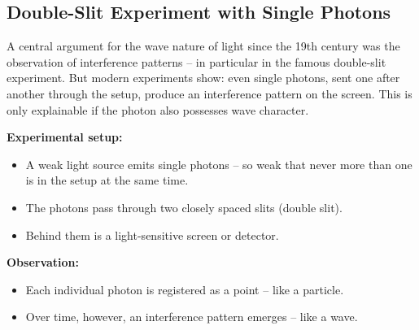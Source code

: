 \subsection{Double-Slit Experiment with Single Photons}

A central argument for the wave nature of light since the 19th century was the observation of interference patterns – in particular in the famous double-slit experiment. But modern experiments show: even single photons, sent one after another through the setup, produce an interference pattern on the screen. This is only explainable if the photon also possesses wave character.


\textbf{Experimental setup:}
\begin{itemize}
	\item A weak light source emits single photons – so weak that never more than one is in the setup at the same time.
	\item The photons pass through two closely spaced slits (double slit).
	\item Behind them is a light-sensitive screen or detector.
\end{itemize}

\textbf{Observation:}
\begin{itemize}
	\item Each individual photon is registered as a point – like a particle.
	\item Over time, however, an interference pattern emerges – like a wave.
\end{itemize}

